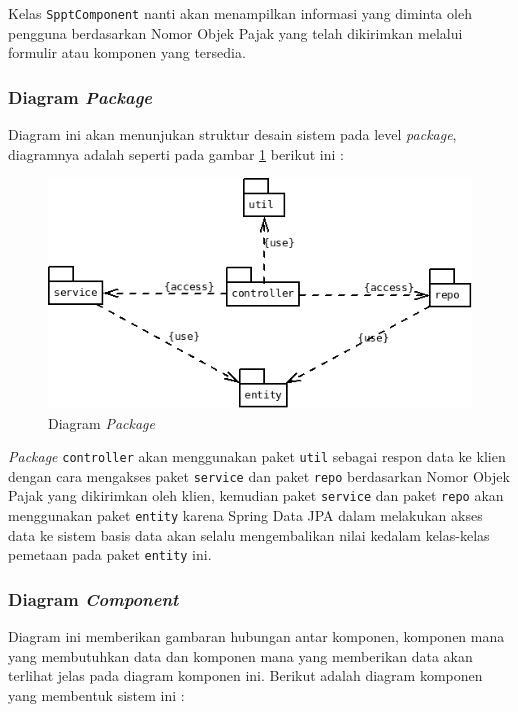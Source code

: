 \documentclass[pdftex,12pt, oneside]{article}
\begin{document}
Kelas \texttt{SpptComponent} nanti akan menampilkan informasi yang diminta oleh pengguna berdasarkan Nomor Objek Pajak yang telah dikirimkan melalui formulir atau komponen yang tersedia.

\subsubsection{Diagram \textit{Package}}

Diagram ini akan menunjukan struktur desain sistem pada level \textit{package}, diagramnya adalah seperti pada gambar \ref{fig:package-dia} berikut ini :

\begin{figure}[H]
	\centering
	\includegraphics[width=1\textwidth]{./resources/package-diagram}
	\caption{Diagram \textit{Package}}
	\label{fig:package-dia}
\end{figure}

\textit{Package} \texttt{controller} akan menggunakan paket \texttt{util} sebagai respon data ke klien dengan cara mengakses paket \texttt{service} dan paket \texttt{repo} berdasarkan Nomor Objek Pajak yang dikirimkan oleh klien, kemudian paket \texttt{service} dan paket \texttt{repo} akan menggunakan paket \texttt{entity} karena Spring Data JPA dalam melakukan akses data ke sistem basis data akan selalu mengembalikan nilai kedalam kelas-kelas pemetaan pada paket \texttt{entity} ini.

\subsubsection{Diagram \textit{Component}}

Diagram ini memberikan gambaran hubungan antar komponen, komponen mana yang membutuhkan data dan komponen mana yang memberikan data akan terlihat jelas pada diagram komponen ini. Berikut adalah diagram komponen yang membentuk sistem ini :
\end{document}
